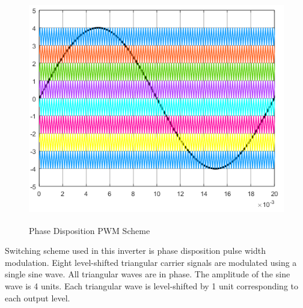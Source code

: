 \documentclass[12pt,a4paper]{report}
\begin{document}
\begin{figure}
	\begin{center}
		\includegraphics[width=16.5cm,height=10cm]{figures/PWMSCHEME.png}
	\end{center}
	\caption{Phase Disposition PWM Scheme}
	\label{PWM}
\end{figure}

Switching scheme used in this inverter is phase disposition pulse width modulation. Eight level-shifted triangular carrier signals are modulated using a single sine wave. All triangular waves are in phase. The amplitude of the sine wave is 4 units. Each triangular wave is level-shifted by 1 unit corresponding to each output level.\\
\end{document}
